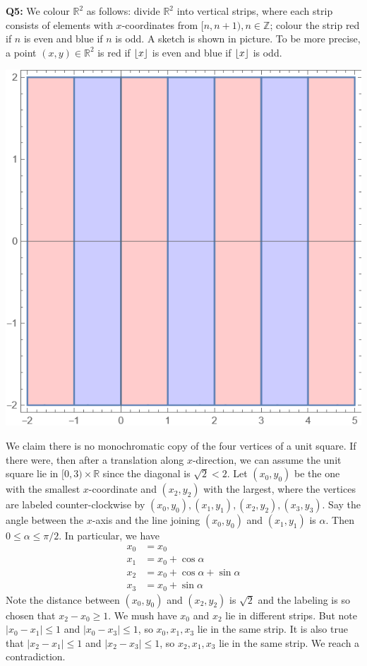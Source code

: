 \documentclass[12pt,reqno]{amsart}
\DeclarePairedDelimiter\floor{\lfloor}{\rfloor}
\theoremstyle{definition}
\newcommand{\ZZ}{\mathbb{Z}}
\newcommand{\RR}{\mathbb{R}}
\begin{document}
\newpage

\noindent \textbf{Q5:} We colour $\RR^2$ as follows: divide $\RR^2$ into vertical strips, where each strip consists of elements with $x$-coordinates from $[n,n+1), n\in \ZZ$; colour the strip red if $n$ is even and blue if $n$ is odd. A sketch is shown in picture. To be more precise, a point $(x,y)\in \RR^2$ is red if $\floor{x}$ is even and blue if $\floor{x}$ is odd.
\begin{center}
  \includegraphics[scale=0.4]{no_square.png}
\end{center}
We claim there is no monochromatic copy of the four vertices of a unit square. If there were, then after a translation along $x$-direction, we can assume the unit square lie in $[0,3)\times \RR$ since the diagonal is $\sqrt{2}<2$. Let $(x_0,y_0)$ be the one with the smallest $x$-coordinate and $(x_2,y_2)$ with the largest, where the vertices are labeled counter-clockwise by $(x_0,y_0),(x_1,y_1),(x_2,y_2),(x_3,y_3)$. Say the angle between the $x$-axis and the  line joining $(x_0,y_0)$ and $(x_1,y_1)$ is $\alpha$. Then $0\leq \alpha \leq \pi/2$. In particular, we have \begin{align*}
  x_0 & = x_0                             \\
  x_1 & = x_0 + \cos{\alpha}              \\
  x_2 & = x_0 + \cos{\alpha}+\sin{\alpha} \\
  x_3 & = x_0 + \sin{\alpha}
\end{align*}
Note the distance between $(x_0,y_0)$ and $(x_2,y_2)$ is $\sqrt{2}$ and the labeling is so chosen that $x_2-x_0 \geq 1$. We mush have $x_0$ and $x_2$ lie in different strips. But note $|x_0-x_1|\leq 1$ and $|x_0-x_3|\leq 1$, so $x_0,x_1,x_3$ lie in the same strip. It is also true that $|x_2-x_1|\leq 1$ and $|x_2-x_3|\leq 1$, so $x_2,x_1,x_3$ lie in the same strip. We reach a contradiction.
\newpage
\end{document}
